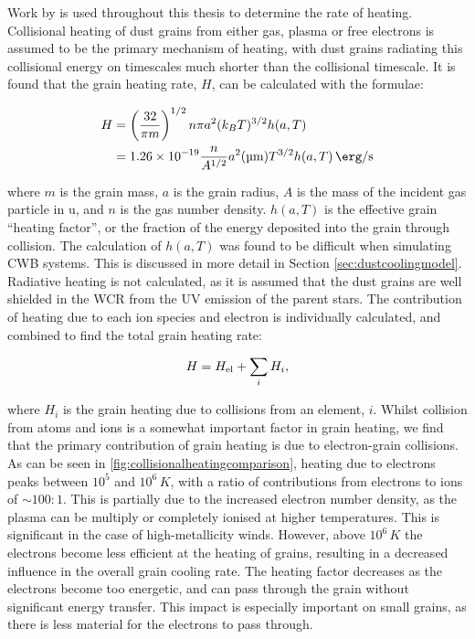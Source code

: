 Work by \textcite{dwek_infrared_1981} is used throughout this thesis to determine the rate of heating.
Collisional heating of dust grains from either gas, plasma or free electrons is assumed to be the primary mechanism of heating, with dust grains radiating this collisional energy on timescales much shorter than the collisional timescale.
It is found that the grain heating rate, $H$, can be calculated with the formulae:

\begin{equation}
  \label{eq:grainheatingrate}
  \begin{split}
    H & = \left(\frac{32}{\pi m}\right)^{1/2} n\pi a^2 (k_B T)^{3/2} h(a,T) \\
    & = \num{1.26e-19} \frac{n}{A^{1/2}} a^2 (\si{\micro\metre}) T^{3/2} h(a,T) \, \si{\erg\per\second}
  \end{split}
\end{equation}

\noindent
where $m$ is the grain mass, $a$ is the grain radius, $A$ is the mass of the incident gas particle in \si{\atomicmassunit}, and $n$ is the gas number density.
$h(a,T)$ is the effective grain ``heating factor'', or the fraction of the energy deposited into the grain through collision.
The calculation of $h(a,T)$ was found to be difficult when simulating CWB systems.
This is discussed in more detail in Section \ref{sec:dustcoolingmodel}.
Radiative heating is not calculated, as it is assumed that the dust grains are well shielded in the WCR from the UV emission of the parent stars.
The contribution of heating due to each ion species and electron is individually calculated, and combined to find the total grain heating rate:

\begin{equation}
  H = H_\text{el} + \sum_i H_i , 
\end{equation}

\noindent
where $H_i$ is the grain heating due to collisions from an element, $i$.
Whilst collision from atoms and ions is a somewhat important factor in grain heating, we find that the primary contribution of grain heating is due to electron-grain collisions.
As can be seen in \ref{fig:collisionalheatingcomparison}, heating due to electrons peaks between $10^5$ and $10^6 \, \si{K}$, with a ratio of contributions from electrons to ions of $\sim 100 : 1$.
This is partially due to the increased electron number density, as the plasma can be multiply or completely ionised at higher temperatures.
This is significant in the case of high-metallicity winds.
However, above $10^6\,\si{K}$ the electrons become less efficient at the heating of grains, resulting in a decreased influence in the overall grain cooling rate.
The heating factor decreases as the electrons become too energetic, and can pass through the grain without significant energy transfer.
This impact is especially important on small grains, as there is less material for the electrons to pass through.

